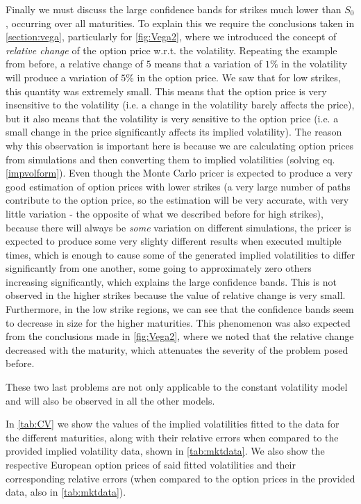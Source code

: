 Finally we must discuss the large confidence bands for strikes much lower than $S_0$, occurring over all maturities. To explain this we require the conclusions taken in \autoref{section:vega}, particularly for \autoref{fig:Vega2}, where we introduced the concept of \emph{relative change} of the option price w.r.t. the volatility. Repeating the example from before, a relative change of $5$ means that a variation of $1\%$ in the volatility will produce a variation of $5\%$ in the option price. We saw that for low strikes, this quantity was extremely small. This means that the option price is very insensitive to the volatility (i.e. a change in the volatility barely affects the price), but it also means that the volatility is very sensitive to the option price (i.e. a small change in the price significantly affects its implied volatility). The reason why this observation is important here is because we are calculating option prices from simulations and then converting them to implied volatilities (solving eq.\eqref{impvolform}).
Even though the Monte Carlo pricer is expected to produce a very good estimation of option prices with lower strikes (a very large number of paths contribute to the option price, so the estimation will be very accurate, with very little variation - the opposite of what we described before for high strikes), because there will always be \emph{some} variation on different simulations, the pricer is expected to produce some very slighty different results when executed multiple times, which is enough to cause some of the generated implied volatilities to differ significantly from one another, some going to approximately zero others increasing significantly, which explains the large confidence bands. This is not observed in the higher strikes because the value of relative change is very small. Furthermore, in the low strike regions, we can see that the confidence bands seem to decrease in size for the higher maturities. This phenomenon was also expected from the conclusions made in \autoref{fig:Vega2}, where we noted that the relative change decreased with the maturity, which attenuates the severity of the problem posed before.

These two last problems are not only applicable to the constant volatility model and will also be observed in all the other models.

\vspace{\fill}
\newpage

In \autoref{tab:CV} we show the values of the implied volatilities fitted to the data for the different maturities, along with their relative errors when compared to the provided implied volatility data, shown in \autoref{tab:mktdata}. We also show the respective European option prices of said fitted volatilities and their corresponding relative errors (when compared to the option prices in the provided data, also in \autoref{tab:mktdata}).



